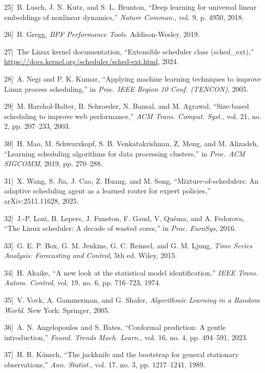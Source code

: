 \documentclass{article}
\begin{document}
\noindent{}{[}25{]}~B. Lusch, J. N. Kutz, and S. L. Brunton, ``Deep learning for universal linear embeddings of nonlinear dynamics,'' \emph{Nature Commun.}, vol. 9, p. 4950, 2018.

\noindent{}{[}26{]}~B. Gregg, \emph{{BPF} Performance Tools}. Addison-Wesley, 2019.

\noindent{}{[}27{]}~{The Linux kernel documentation}, ``Extensible scheduler class (sched\_ext),'' \url{https://docs.kernel.org/scheduler/sched-ext.html}, 2024.

\noindent{}{[}28{]}~A. Negi and P. K. Kumar, ``Applying machine learning techniques to improve {Linux} process scheduling,'' in \emph{Proc. IEEE Region 10 Conf. (TENCON)}, 2005.

\noindent{}{[}29{]}~M. Harchol-Balter, B. Schroeder, N. Bansal, and M. Agrawal, ``Size-based scheduling to improve web performance,'' \emph{ACM Trans. Comput. Syst.}, vol. 21, no. 2, pp. 207--233, 2003.

\noindent{}{[}30{]}~H. Mao, M. Schwarzkopf, S. B. Venkatakrishnan, Z. Meng, and M. Alizadeh, ``Learning scheduling algorithms for data processing clusters,'' in \emph{Proc. ACM SIGCOMM}, 2019, pp. 270--288.

\noindent{}{[}31{]}~X. Wang, S. Jia, J. Cao, Z. Huang, and M. Song, ``Mixture-of-schedulers: An adaptive scheduling agent as a learned router for expert policies,'' arXiv:2511.11628, 2025.

\noindent{}{[}32{]}~J.-P. Lozi, B. Lepers, J. Funston, F. Gaud, V. Qu{\'e}ma, and A. Fedorova, ``The {Linux} scheduler: A decade of wasted cores,'' in \emph{Proc. EuroSys}, 2016.

\noindent{}{[}33{]}~G. E. P. Box, G. M. Jenkins, G. C. Reinsel, and G. M. Ljung, \emph{Time Series Analysis: Forecasting and Control}, 5th ed. Wiley, 2015.

\noindent{}{[}34{]}~H. Akaike, ``A new look at the statistical model identification,'' \emph{IEEE Trans. Autom. Control}, vol. 19, no. 6, pp. 716--723, 1974.

\noindent{}{[}35{]}~V. Vovk, A. Gammerman, and G. Shafer, \emph{Algorithmic Learning in a Random World}. New York: Springer, 2005.

\noindent{}{[}36{]}~A. N. Angelopoulos and S. Bates, ``Conformal prediction: A gentle introduction,'' \emph{Found. Trends Mach. Learn.}, vol. 16, no. 4, pp. 494--591, 2023.

\noindent{}{[}37{]}~H. R. K\"unsch, ``The jackknife and the bootstrap for general stationary observations,'' \emph{Ann. Statist.}, vol. 17, no. 3, pp. 1217--1241, 1989.
\end{document}

